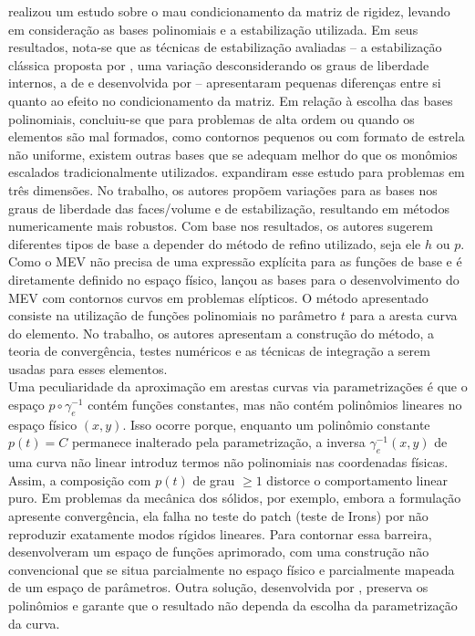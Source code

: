 \indent \citet{illconditioningvirtualelementmethodstabilizationsbases2018} realizou um estudo sobre o mau condicionamento da matriz de rigidez, levando em consideração as bases polinomiais e a estabilização utilizada. Em seus resultados, nota-se que as técnicas de estabilização avaliadas -- a estabilização clássica proposta por \citet{basicprinciplesvirtualelementmethods2013a}, uma variação desconsiderando os graus de liberdade internos, a de \citet{exponentialconvergencehpvirtualelementmethodpresencecornersingularities2018} e desenvolvida por \citet{beiraodaveiga2017high} -- apresentaram pequenas diferenças entre si quanto ao efeito no condicionamento da matriz. Em relação à escolha das bases polinomiais, concluiu-se que para problemas de alta ordem ou quando os elementos são mal formados, como contornos pequenos ou com formato de estrela não uniforme, existem outras bases que se adequam melhor do que os monômios escalados tradicionalmente utilizados. \citet{exploringhighorderthreedimensionalvirtualelementsbasesstabilizations2018} expandiram esse estudo para problemas em três dimensões. No trabalho, os autores propõem variações para as bases nos graus de liberdade das faces/volume e de estabilização, resultando em métodos numericamente mais robustos. Com base nos resultados, os autores sugerem diferentes tipos de base a depender do método de refino utilizado, seja ele $h$ ou $p$.\\ 
\indent Como o MEV não precisa de uma expressão explícita para as funções de base e é diretamente definido no espaço físico, \citet{virtualelementmethodcurvededges2019} lançou as bases para o desenvolvimento do MEV com contornos curvos em problemas elípticos. O método apresentado consiste na utilização de funções polinomiais no parâmetro $t$ para a aresta curva do elemento. No trabalho, os autores apresentam a construção do método, a teoria de convergência, testes numéricos e as técnicas de integração a serem usadas para esses elementos.  \\
\indent Uma peculiaridade da aproximação em arestas curvas via parametrizações é que o espaço $p \circ \gamma_e^{-1}$ contém funções constantes, mas não contém polinômios lineares no espaço físico $(x,y)$. Isso ocorre porque, enquanto um polinômio constante $p(t) = C$ permanece inalterado pela parametrização, a inversa $\gamma_e^{-1}(x,y)$ de uma curva não linear introduz termos não polinomiais nas coordenadas físicas. Assim, a composição com $p(t)$ de grau $\ge 1$ distorce o comportamento linear puro. Em problemas da mecânica dos sólidos, por exemplo, embora a formulação apresente convergência, ela falha no teste do patch (teste de Irons) por não reproduzir exatamente modos rígidos lineares. Para contornar essa barreira, \citet{curvilinearvirtualelements2dsolidmechanicsapplications2020} desenvolveram um espaço de funções aprimorado, com uma construção não convencional que se situa parcialmente no espaço físico e parcialmente mapeada de um espaço de parâmetros. Outra solução, desenvolvida por \citet{polynomialpreservingvirtualelementscurvededges2020}, preserva os polinômios e garante que o resultado não dependa da escolha da parametrização da curva. \\
